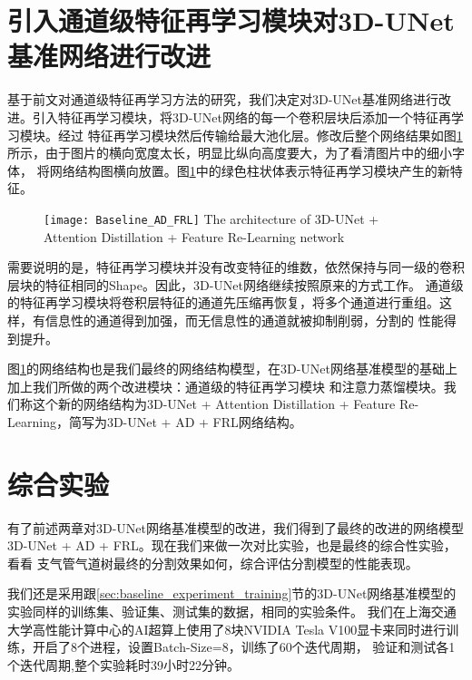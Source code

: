 \section{引入通道级特征再学习模块对3D-UNet基准网络进行改进}

基于前文对通道级特征再学习方法的研究，我们决定对3D-UNet基准网络进行改进。引入特征再学习模块，将3D-UNet网络的每一个卷积层块后添加一个特征再学习模块。经过
特征再学习模块然后传输给最大池化层。修改后整个网络结果如图\ref{fig:3dunet_ad_fr}所示，由于图片的横向宽度太长，明显比纵向高度要大，为了看清图片中的细小字体，
将网络结构图横向放置。图\ref{fig:3dunet_ad_fr}中的绿色柱状体表示特征再学习模块产生的新特征。
\begin{figure}[!htp]
    \centering
    \texttt{[image: Baseline\_AD\_FRL]}
        {The architecture of 3D-UNet + Attention Distillation + Feature Re-Learning network}
    \label{fig:3dunet_ad_fr}
\end{figure}
需要说明的是，特征再学习模块并没有改变特征的维数，依然保持与同一级的卷积层块的特征相同的Shape。因此，3D-UNet网络继续按照原来的方式工作。
通道级的特征再学习模块将卷积层特征的通道先压缩再恢复，将多个通道进行重组。这样，有信息性的通道得到加强，而无信息性的通道就被抑制削弱，分割的
性能得到提升。

图\ref{fig:3dunet_ad_fr}的网络结构也是我们最终的网络结构模型，在3D-UNet网络基准模型的基础上加上我们所做的两个改进模块：通道级的特征再学习模块
和注意力蒸馏模块。我们称这个新的网络结构为3D-UNet + Attention Distillation + Feature Re-Learning，简写为3D-UNet + AD + FRL网络结构。

\section{综合实验}

有了前述两章对3D-UNet网络基准模型的改进，我们得到了最终的改进的网络模型3D-UNet + AD + FRL。现在我们来做一次对比实验，也是最终的综合性实验，看看
支气管气道树最终的分割效果如何，综合评估分割模型的性能表现。

我们还是采用跟\ref{sec:baseline_experiment_training}节的3D-UNet网络基准模型的实验同样的训练集、验证集、测试集的数据，相同的实验条件。
我们在上海交通大学高性能计算中心的AI超算上使用了8块NVIDIA Tesla V100显卡来同时进行训练，开启了8个进程，设置Batch-Size=8，训练了60个迭代周期，
验证和测试各1个迭代周期,整个实验耗时39小时22分钟。

